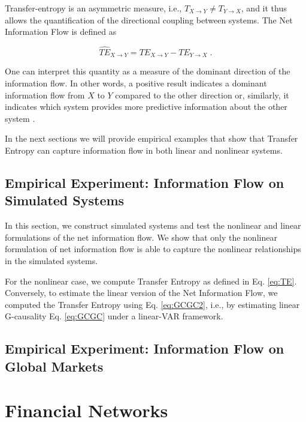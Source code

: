 \documentclass[]{book}
\theoremstyle{definition}
\theoremstyle{definition}
\theoremstyle{definition}
\theoremstyle{remark}
\begin{document}
Transfer-entropy is an asymmetric measure, i.e.,
\(T_{X \rightarrow Y} \neq T_{Y \rightarrow X}\), and it thus allows the
quantification of the directional coupling between systems. The Net
Information Flow is defined as

\begin{equation}
\widehat{TE}_{X \rightarrow Y} = TE_{X \rightarrow Y} - TE_{Y \rightarrow X}\;.
\end{equation}

One can interpret this quantity as a measure of the dominant direction
of the information flow. In other words, a positive result indicates a
dominant information flow from \(X\) to \(Y\) compared to the other
direction or, similarly, it indicates which system provides more
predictive information about the other system
\citep{Michalowicz:2013:HDE:2601840}.

In the next sections we will provide empirical examples that show that
Transfer Entropy can capture information flow in both linear and
nonlinear systems.

\section{Empirical Experiment: Information Flow on Simulated
Systems}\label{empirical-experiment-information-flow-on-simulated-systems}

In this section, we construct simulated systems and test the nonlinear
and linear formulations of the net information flow. We show that only
the nonlinear formulation of net information flow is able to capture the
nonlinear relationships in the simulated systems.

For the nonlinear case, we compute Transfer Entropy as defined in Eq.
\eqref{eq:TE}. Conversely, to estimate the linear version of the Net
Information Flow, we computed the Transfer Entropy using Eq.
\eqref{eq:GCGC2}, i.e., by estimating linear G-causality Eq. \eqref{eq:GCGC}
under a linear-VAR framework.

\section{Empirical Experiment: Information Flow on Global
Markets}\label{empirical-experiment-information-flow-on-global-markets}

\chapter{Financial Networks}\label{financial-networks}
\end{document}

